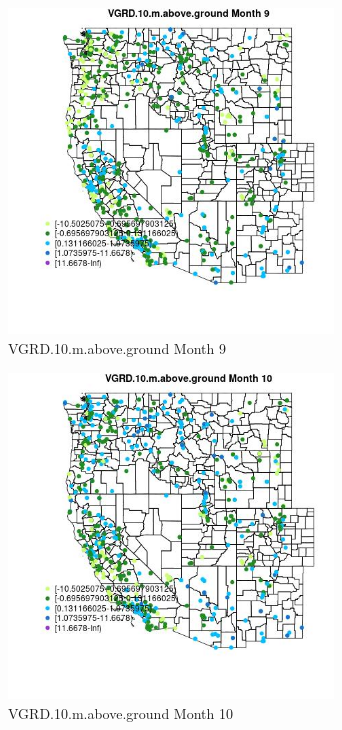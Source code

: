 \begin{figure} 
\centering  
\includegraphics[width=0.77\textwidth]{Code_Outputs/Report_ML_input_PM25_Step4_part_e_de_duplicated_aves_compiled_2019-05-14wNAs_MapObsMo9VGRD10maboveground.jpg} 
\caption{\label{fig:Report_ML_input_PM25_Step4_part_e_de_duplicated_aves_compiled_2019-05-14wNAsMapObsMo9VGRD10maboveground}VGRD.10.m.above.ground Month 9} 
\end{figure} 
 

\begin{figure} 
\centering  
\includegraphics[width=0.77\textwidth]{Code_Outputs/Report_ML_input_PM25_Step4_part_e_de_duplicated_aves_compiled_2019-05-14wNAs_MapObsMo10VGRD10maboveground.jpg} 
\caption{\label{fig:Report_ML_input_PM25_Step4_part_e_de_duplicated_aves_compiled_2019-05-14wNAsMapObsMo10VGRD10maboveground}VGRD.10.m.above.ground Month 10} 
\end{figure} 
 

